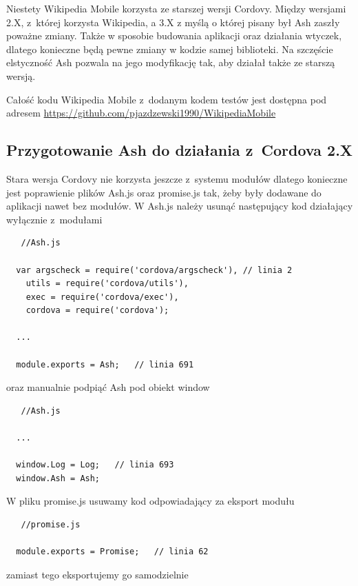 \documentclass[brudnopis]{xmgr}
\begin{document}
Niestety Wikipedia Mobile korzysta ze starszej wersji Cordovy. Między wersjami 2.X, z~której korzysta Wikipedia, a 3.X z myślą o której pisany był Ash zaszły poważne zmiany. Także w sposobie budowania aplikacji oraz działania wtyczek, dlatego konieczne będą pewne zmiany w kodzie samej biblioteki. Na szczęście elstyczność Ash pozwala na jego modyfikację tak, aby działał także ze starszą wersją.

Całość kodu Wikipedia Mobile z~dodanym kodem testów jest dostępna pod adresem \url{https://github.com/pjazdzewski1990/WikipediaMobile} 

\subsection{Przygotowanie Ash do działania z~Cordova 2.X}
  
Stara wersja Cordovy nie korzysta jeszcze z~systemu modułów dlatego konieczne jest poprawienie plików Ash.js oraz promise.js tak, żeby były dodawane do aplikacji nawet bez modułów.  W Ash.js należy usunąć następujący kod działający wyłącznie z~modułami

\begin{lstlisting}
   //Ash.js
  
  var argscheck = require('cordova/argscheck'), // linia 2
    utils = require('cordova/utils'),
    exec = require('cordova/exec'),
    cordova = require('cordova');

  ...

  module.exports = Ash;   // linia 691

\end{lstlisting}

oraz manualnie podpiąć Ash pod obiekt window

\begin{lstlisting}
   //Ash.js

  ...

  window.Log = Log;   // linia 693
  window.Ash = Ash;

\end{lstlisting}

W pliku promise.js usuwamy kod odpowiadający za eksport modułu

\begin{lstlisting}
   //promise.js
 
  module.exports = Promise;   // linia 62 

\end{lstlisting}

zamiast tego eksportujemy go samodzielnie 
\end{document}
